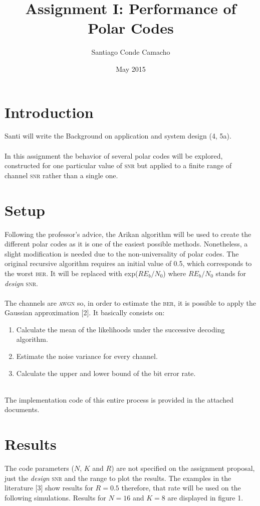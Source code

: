 \documentclass{article}
\title{Assignment I: Performance of Polar Codes}
\author{Santiago Conde Camacho}
\date{May 2015}
\begin{document}
\maketitle

\section{Introduction}
Santi will write the Background on application and system design (4, 5a). 
\\\\
In this assignment the behavior of several polar codes will be explored, constructed for one particular value of \textsc{snr} but applied to a finite range of channel \textsc{snr} rather than a single one.
\section{Setup}
Following the professor's advice, the Arikan algorithm \cite{arikan01} will be used to create the different polar codes as it is one of the easiest possible methods. Nonetheless, a slight modification is needed due to the non-universality of polar codes. The original recursive algorithm requires an initial value of 0.5, which corresponds to the worst \textsc{ber}. It will be replaced with exp($R E_b/N_0$) where $R E_b/N_0$ stands for \textit{design} \textsc{snr}. 
\\\\
The channels are \textsc{awgn} so, in order to estimate the \textsc{ber}, it is possible to apply the Gaussian approximation [2]. It basically consists on: 
\begin{enumerate}
\item Calculate the mean of the likelihoods under the successive decoding algorithm.
\item Estimate the noise variance for every channel.
\item Calculate the upper and lower bound of the bit error rate.
\end{enumerate}
\\
The implementation code of this entire process is provided in the attached documents. 
\section{Results}
The code parameters ($N$, $K$ and $R$) are not specified on the assignment proposal, just the \textit{design} \textsc{snr} and the range to plot the results. The examples in the literature [3] show results for $R=0.5$ therefore, that rate will be used on the following simulations. Results for $N=16$ and $K=8$ are displayed in figure 1.
\end{document}
